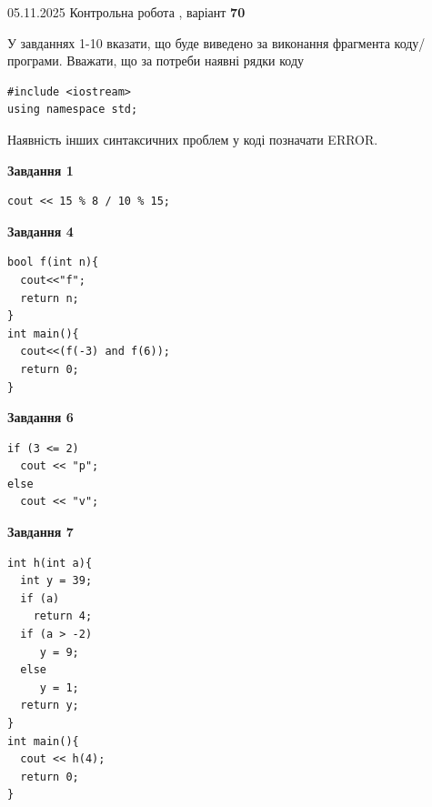 \documentclass[12pt, ukrainian]{article}
\begin{document}
\newpage

{\Large{05.11.2025 Контрольна робота , варіант  \No \textbf { 70 }\par}}
{
\begin {large}
У завданнях 1-10 вказати, що буде виведено за виконання фрагмента коду/про\-гра\-ми.
Вважати, що за потреби наявні рядки коду
\begin{verbatim}
#include <iostream>
using namespace std;
\end{verbatim}
Наявність інших синтаксичних проблем у коді позначати ERROR.

\begin{minipage}[t]{7.0cm}

\begin{center}
\textbf{Завдання 1}
\end{center}
\vspace{-8mm}

\begin{verbatim}
cout << 15 % 8 / 10 % 15;
\end{verbatim}



\begin{center}
\textbf{Завдання 4}
\end{center}
\vspace{-8mm}

\begin{verbatim}
bool f(int n){
  cout<<"f";
  return n;
}
int main(){
  cout<<(f(-3) and f(6));
  return 0;
}
\end{verbatim}



\begin{center}
\textbf{Завдання 6}
\end{center}
\vspace{-8mm}

\begin{verbatim}
if (3 <= 2)
  cout << "p";
else
  cout << "v";
\end{verbatim}



\begin{center}
\textbf{Завдання 7}
\end{center}
\vspace{-8mm}

\begin{verbatim}
int h(int a){
  int y = 39;
  if (a)
    return 4;
  if (a > -2)
     y = 9;
  else
     y = 1;
  return y;
}
int main(){
  cout << h(4);
  return 0;
}
\end{verbatim}


\end{minipage}
\end{large}}
\end{document}
